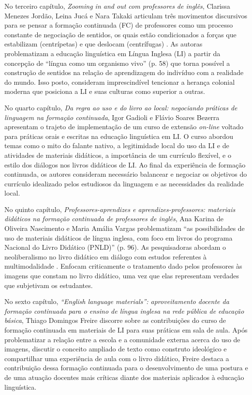 \documentclass[portuguese]{textolivre}
\begin{document}
No terceiro capítulo, \textit{Zooming in and out com professores de inglês}, Clarissa Menezes Jordão, Leina Jucá e Nara Takaki articulam três movimentos discursivos para se pensar a formação continuada (FC) de professores como um processo constante de negociação de sentidos, os quais estão condicionados a forças que estabilizam (centrípetas) e que deslocam (centrífugas) \cite{bakhtin_marxismo_1997}. As autoras problematizam a educação linguística em Língua Inglesa (LI) a partir da concepção de “língua como um organismo vivo” (p. 58) que torna possível a construção de sentidos na relação de aprendizagem do indivíduo com a realidade do mundo. Isso posto, consideram imprescindível tencionar a herança colonial moderna que posiciona a LI e suas culturas como superior a outras. 

No quarto capítulo, \textit{Da regra ao uso e do livro ao local: negociando práticas de linguagem na formação continuada}, Igor Gadioli e Flávio Soares Bezerra apresentam o trajeto de implementação de um curso de extensão \textit{on-line} voltado para práticas orais e escritas na educação linguística em LI. O curso abordou temas como o mito do falante nativo, a legitimidade local do uso da LI e de atividades de materiais didáticos, a importância de um currículo flexível, e o estilo dos diálogos nos livros didáticos de LI. Ao final da experiência de formação continuada, os autores consideram necessário balancear e negociar os objetivos do currículo idealizado pelos estudiosos da linguagem e as necessidades da realidade local.

No quinto capítulo, \textit{Professores-aprendizes e aprendizes-professores: materiais didáticos na formação continuada de professores de inglês}, Ana Karina de Oliveira Nascimento e Maria Amália Vargas problematizam “as possibilidades de uso de materiais didáticos de língua inglesa, com foco em livros do programa Nacional do Livro Didático (PNLD)” (p. 96). As pesquisadoras abordam o neoliberalismo no livro didático \cite{zacchi_neoliberalismo_2016} em diálogo com estudos referentes à multimodalidade \cite{cope_multimodality_2003}. Enfocam criticamente o tratamento dado pelos professores às imagens que constam no livro didático, uma vez que elas representam verdades que subjetivam os estudantes.

No sexto capítulo, \textit{“English language materials”: aproveitamento docente da formação continuada para o ensino de língua inglesa na rede pública de educação básica}, Thiago Domingos Freire discorre sobre as contribuições do curso de formação continuada em materiais de LI para suas práticas em sala de aula. Após problematizar a relação entre a escola e a comunidade externa acerca do uso de imagens, discutir o conceito ampliado de texto como construto ideológico e compartilhar uma experiência de aula com o livro didático, Freire destaca a contribuição dessa formação continuada para o desenvolvimento de uma postura e de uma atuação docentes mais críticas diante dos materiais aplicados à educação linguística.
\end{document}
